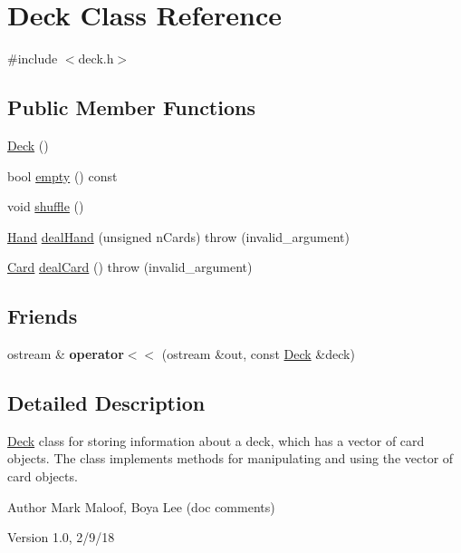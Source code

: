 \hypertarget{classDeck}{
\section{Deck Class Reference}
\label{classDeck}
}


{\ttfamily \#include $<$deck.h$>$}\subsection*{Public Member Functions}
\begin{DoxyCompactItemize}
\item 
\hyperlink{classDeck_a57ae1cb4ac6fd61c249cefb2db85eb99}{Deck} ()
\item 
bool \hyperlink{classDeck_aff5fe74415782b0604d5a9f568acb2f7}{empty} () const 
\item 
void \hyperlink{classDeck_ae5a1e52ab00ae5924f2bc6b730dba3eb}{shuffle} ()
\item 
\hyperlink{classHand}{Hand} \hyperlink{classDeck_a6b5adf60851c8e28c5d6315e3616e8e2}{dealHand} (unsigned nCards)  throw (invalid\_\-argument)
\item 
\hyperlink{classCard}{Card} \hyperlink{classDeck_a7a0547af6395feb13f4402a2a63b79fe}{dealCard} ()  throw (invalid\_\-argument)
\end{DoxyCompactItemize}
\subsection*{Friends}
\begin{DoxyCompactItemize}
\item 
\hypertarget{classDeck_abd774eb3626da4838cef6e9622147df2}{
ostream \& {\bfseries operator$<$$<$} (ostream \&out, const \hyperlink{classDeck}{Deck} \&deck)}
\label{classDeck_abd774eb3626da4838cef6e9622147df2}

\end{DoxyCompactItemize}


\subsection{Detailed Description}
\hyperlink{classDeck}{Deck} class for storing information about a deck, which has a vector of card objects. The class implements methods for manipulating and using the vector of card objects.

\begin{DoxyAuthor}{Author}
Mark Maloof, Boya Lee (doc comments) 
\end{DoxyAuthor}
\begin{DoxyVersion}{Version}
1.0, 2/9/18 
\end{DoxyVersion}


